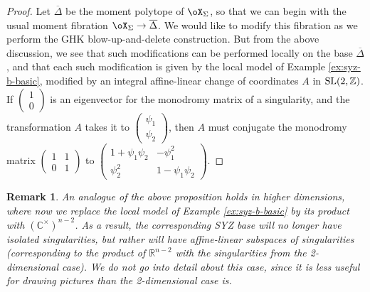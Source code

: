 \documentclass[pdftex]{sigma}%
\numberwithin{equation}{section}
\newtheorem{Remark}[Theorem]{Remark} }
\def\CC{\mathbb{C}}
\def\RR{\mathbb{R}}
\def\ZZ{\mathbb{Z}}
\newcommand\SL{\textup{SL}}
\begin{document}
\begin{proof}Let $\overline{\Delta}$ be the moment polytope of $\oX_\Sigma$, so that we can begin with the usual moment fibration $\oX_\Sigma\to \overline{\Delta}$. We would like to modify this fibration as we perform the GHK blow-up-and-delete construction. But from the above discussion, we see that such modifications can be performed locally on the base $\overline{\Delta}$, and that each such modification is given by the local model of
 Example \ref{ex:syz-b-basic}, modified by an integral affine-linear change of coordinates $A$ in $\SL(2,\ZZ)$. If
 $\left(\begin{smallmatrix}1\\0\end{smallmatrix}\right)$ is an eigenvector for the monodromy matrix of a singularity, and the transformation $A$ takes it to
 $\left(\begin{smallmatrix}\psi_1\\\psi_2\end{smallmatrix}\right)$,
 then $A$ must conjugate the monodromy matrix
 $\left(\begin{smallmatrix}1&1\\0&1\end{smallmatrix}\right)$ to
 $\left(\begin{smallmatrix}1+\psi_1\psi_2&-\psi_1^2\\\psi_2^2&1-\psi_1\psi_2\end{smallmatrix}\right)$.
\end{proof}

\begin{Remark}
 An analogue of the above proposition holds in higher dimensions, where now we replace the local model of Example \ref{ex:syz-b-basic} by its product with $(\CC^\times)^{n-2}$. As a result, the corresponding SYZ base will no longer have isolated singularities, but rather will have affine-linear subspaces of singularities (corresponding to the product of $\RR^{n-2}$ with the singularities from the 2-dimensional case). We do not go into detail about this case, since it is less useful for drawing pictures than the 2-dimensional case is.
\end{Remark}
\end{document}
